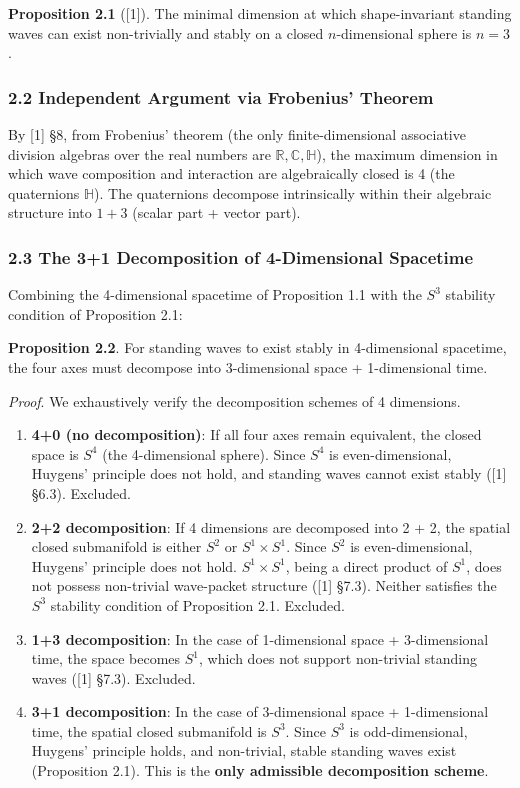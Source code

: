 \documentclass[
  a4paper,11pt]{article}
\begin{document}
\textbf{Proposition 2.1} ({[}1{]}). The minimal dimension at which
shape-invariant standing waves can exist non-trivially and stably on a
closed \(n\)-dimensional sphere is \(n = 3\).

\subsubsection{2.2 Independent Argument via Frobenius'
Theorem}\label{independent-argument-via-frobenius-theorem}

By {[}1{]} §8, from Frobenius' theorem (the only finite-dimensional
associative division algebras over the real numbers are
\(\mathbb{R}, \mathbb{C}, \mathbb{H}\)), the maximum dimension in which
wave composition and interaction are algebraically closed is 4 (the
quaternions \(\mathbb{H}\)). The quaternions decompose intrinsically
within their algebraic structure into \(1 + 3\) (scalar part + vector
part).

\subsubsection{2.3 The 3+1 Decomposition of 4-Dimensional
Spacetime}\label{the-31-decomposition-of-4-dimensional-spacetime}

Combining the 4-dimensional spacetime of Proposition 1.1 with the
\(S^3\) stability condition of Proposition 2.1:

\textbf{Proposition 2.2}. For standing waves to exist stably in
4-dimensional spacetime, the four axes must decompose into 3-dimensional
space + 1-dimensional time.

\emph{Proof}. We exhaustively verify the decomposition schemes of 4
dimensions.

\begin{enumerate}
\def\labelenumi{(\roman{enumi})}
\item
  \textbf{4+0 (no decomposition)}: If all four axes remain equivalent,
  the closed space is \(S^4\) (the 4-dimensional sphere). Since \(S^4\)
  is even-dimensional, Huygens' principle does not hold, and standing
  waves cannot exist stably ({[}1{]} §6.3). Excluded.
\item
  \textbf{2+2 decomposition}: If 4 dimensions are decomposed into 2 + 2,
  the spatial closed submanifold is either \(S^2\) or
  \(S^1 \times S^1\). Since \(S^2\) is even-dimensional, Huygens'
  principle does not hold. \(S^1 \times S^1\), being a direct product of
  \(S^1\), does not possess non-trivial wave-packet structure ({[}1{]}
  §7.3). Neither satisfies the \(S^3\) stability condition of
  Proposition 2.1. Excluded.
\item
  \textbf{1+3 decomposition}: In the case of 1-dimensional space +
  3-dimensional time, the space becomes \(S^1\), which does not support
  non-trivial standing waves ({[}1{]} §7.3). Excluded.
\item
  \textbf{3+1 decomposition}: In the case of 3-dimensional space +
  1-dimensional time, the spatial closed submanifold is \(S^3\). Since
  \(S^3\) is odd-dimensional, Huygens' principle holds, and non-trivial,
  stable standing waves exist (Proposition 2.1). This is the
  \textbf{only admissible decomposition scheme}.
\end{enumerate}
\end{document}

